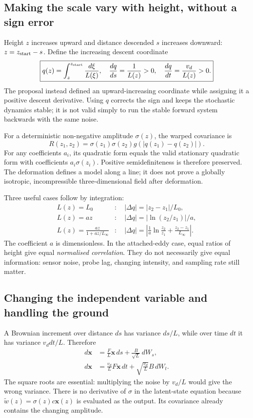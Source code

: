 \subsection{Making the scale vary with height, without a sign error}
Height $z$ increases upward and distance descended $s$ increases downward: $z=z_{\rm start}-s$. Define the increasing descent coordinate
\begin{equation}
 \boxed{q(z)=\int_z^{z_{\rm start}}\frac{d\xi}{L(\xi)},\quad
 \frac{dq}{ds}=\frac1{L(z)}>0,\quad \frac{dq}{dt}=\frac{v_d}{L(z)}>0.}
\end{equation}
The proposal instead defined an upward-increasing coordinate while assigning it a positive descent derivative. Using $q$ corrects the sign and keeps the stochastic dynamics stable; it is not valid simply to run the stable forward system backwards with the same noise.

For a deterministic non-negative amplitude $\sigma(z)$, the warped covariance is
\begin{equation}
 R(z_1,z_2)=\sigma(z_1)\sigma(z_2)g(|q(z_1)-q(z_2)|).
\end{equation}
For any coefficients $a_i$, its quadratic form equals the valid stationary quadratic form with coefficients $a_i\sigma(z_i)$. Positive semidefiniteness is therefore preserved. The deformation defines a model along a line; it does not prove a globally isotropic, incompressible three-dimensional field after deformation.

Three useful cases follow by integration:
\begin{align}
 L(z)=L_0 &: \quad |\Delta q|=|z_2-z_1|/L_0,\\
 L(z)=az &: \quad |\Delta q|=|\ln(z_2/z_1)|/a,\\
 L(z)=\frac{az}{1+az/L_\infty} &: \quad |\Delta q|=
 \left|\frac1a\ln\frac{z_2}{z_1}+\frac{z_2-z_1}{L_\infty}\right|.
\end{align}
The coefficient $a$ is dimensionless. In the attached-eddy case, equal ratios of height give equal \emph{normalised correlation}. They do not necessarily give equal information: sensor noise, probe lag, changing intensity, and sampling rate still matter.

\subsection{Changing the independent variable and handling the ground}
A Brownian increment over distance $ds$ has variance $ds/L$, while over time $dt$ it has variance $v_d dt/L$. Therefore
\begin{align}
 d\mathbf x&=\frac FL\mathbf x\,ds+\frac B{\sqrt L}\,dW_s,\\
 d\mathbf x&=\frac{v_d}{L}F\mathbf x\,dt+\sqrt{\frac{v_d}{L}}B\,dW_t.
\end{align}
The square roots are essential: multiplying the noise by $v_d/L$ would give the wrong variance. There is no derivative of $\sigma$ in the latent-state equation because $\widetilde w(z)=\sigma(z)c\mathbf x(z)$ is evaluated as the output. Its covariance already contains the changing amplitude.

